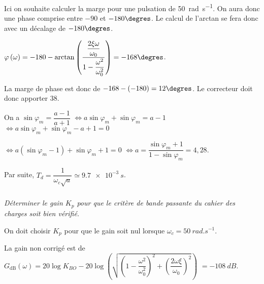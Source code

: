 \begin{multicols}{2}
\begin{corrige}
Ici on souhaite calculer la marge pour une pulsation de \SI{50}{rad.s^{-1}}. On aura donc une phase comprise entre $-90$ et $-180\degres$. Le calcul de l'arctan se fera donc avec un décalage de $-180\degres$. 



$\varphi\left(\omega\right)=-180- \arctan\left( \dfrac{\dfrac{2 \xi \omega}{\omega_0}}{1-\dfrac{\omega^2}{\omega_0^2}}\right)=-168\degres $.

La marge de phase est donc de $-168-(-180) = 12\degres$. Le correcteur doit donc apporter 38\degres. 

On a $\sin\varphi_m = \dfrac{a-1}{a+1}$ $\Leftrightarrow a \sin\varphi_m + \sin\varphi_m = a- 1 $
$\Leftrightarrow a \sin\varphi_m + \sin\varphi_m -a+1 = 0 $

$\Leftrightarrow a \left( \sin\varphi_m -1\right)+ \sin\varphi_m +1 = 0 $
$\Leftrightarrow a   = \dfrac{\sin\varphi_m +1}{1-\sin\varphi_m} =4,28$.

Par suite, $T_d = \dfrac{1}{\omega_c\sqrt{a}}\simeq \SI{9,7e-3}{s}$.


%
%
 

\end{corrige}
\else
\fi


\subparagraph{} \textit{Déterminer le gain $K_p$ pour que le critère de bande passante du cahier des charges soit bien vérifié.}
\ifprof
\begin{corrige}
On doit choisir $K_p$ pour que le gain soit nul lorsque $\omega_c = \SI{50}{rad.s^{-1}}$. 

La gain non corrigé est de $G_{\text{dB}}(\omega)=20\log K_{BO} - 20 \log \left( \sqrt{\left( 1-\dfrac{\omega^2}{\omega_0^2}\right)^2+\left( \dfrac{2\omega\xi}{\omega_0}\right)^2}\right)$
$=\SI{-108}{dB}$.


\end{corrige}
\end{multicols}
